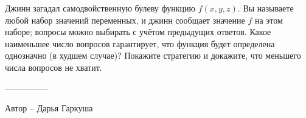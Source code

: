 \question
Джинн загадал самодвойственную булеву функцию $f(x,y,z)$. Вы называете любой набор значений переменных, и джинн сообщает значение $f$ на этом наборе; вопросы можно выбирать с учётом предыдущих ответов. Какое наименьшее число вопросов гарантирует, что функция будет определена однозначно (в худшем случае)? Покажите стратегию и докажите, что меньшего числа вопросов не хватит.

---------------

Автор -- Дарья Гаркуша